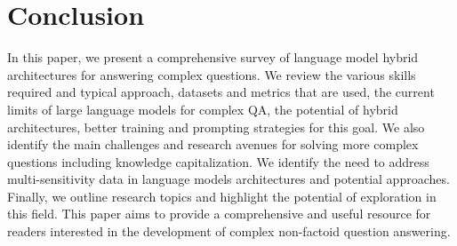 \documentclass[acmsmall]{acmart}
\begin{document}
\section{Conclusion}
In this paper, we present a comprehensive survey of language model hybrid architectures for answering complex questions. We review the various skills required and typical approach, datasets and metrics that are used, the current limits of large language models for complex QA, the potential of hybrid architectures, better training and prompting strategies for this goal. We also identify the main challenges and research avenues for solving more complex questions including knowledge capitalization. We identify the need to address multi-sensitivity data in language models architectures and potential approaches. Finally, we outline research topics and highlight the potential of exploration in this field. This paper aims to provide a comprehensive and useful resource for readers interested in the development of complex non-factoid question answering.

\label{sec_biblio}
\end{document}

